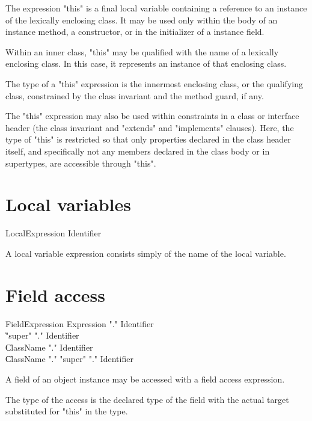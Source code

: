 The expression \xcd"this" is a final local variable containing a reference
to an instance of the lexically enclosing class.
It may be used only within the body of an instance method, a
constructor, or in the initializer of a instance field.

Within an inner class, \xcd"this" may be qualified with the
name of a lexically enclosing class.  In this case, it
represents an instance of that enclosing class.

The type of a \xcd"this" expression is the
innermost enclosing class, or the qualifying class,
constrained by the class invariant and the
method guard, if any.

The \xcd"this" expression may also be used within constraints in
a class or interface header (the class invariant and
\xcd"extends" and \xcd"implements" clauses).  Here, the type of
\xcd"this" is restricted so that only properties declared in the
class header itself, and specifically not any members declared in the class
body or in supertypes, are accessible through \xcd"this".

\section{Local variables}


\begin{grammar}
LocalExpression \: Identifier \\
\end{grammar}

A local variable expression consists simply of the name of the
local variable.


\section{Field access}
\label{FieldAccess}


\begin{grammar}
FieldExpression \: Expression \xcd"." Identifier \\
                \| \xcd"super" \xcd"." Identifier \\
                \| ClassName \xcd"." Identifier \\
                \| ClassName \xcd"." \xcd"super" \xcd"." Identifier \\
\end{grammar}

A field of an object instance may be  accessed
with a field access expression.

The type of the access is the declared type of the field with the
actual target substituted for \xcd"this" in the type. 

